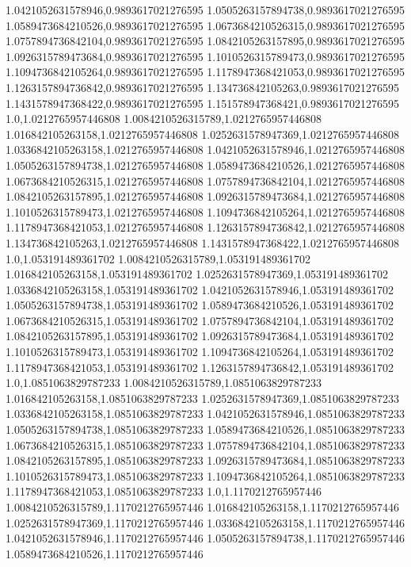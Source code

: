 1.0421052631578946,0.9893617021276595
1.0505263157894738,0.9893617021276595
1.0589473684210526,0.9893617021276595
1.0673684210526315,0.9893617021276595
1.0757894736842104,0.9893617021276595
1.0842105263157895,0.9893617021276595
1.0926315789473684,0.9893617021276595
1.1010526315789473,0.9893617021276595
1.1094736842105264,0.9893617021276595
1.1178947368421053,0.9893617021276595
1.1263157894736842,0.9893617021276595
1.134736842105263,0.9893617021276595
1.1431578947368422,0.9893617021276595
1.151578947368421,0.9893617021276595
1.0,1.0212765957446808
1.0084210526315789,1.0212765957446808
1.016842105263158,1.0212765957446808
1.0252631578947369,1.0212765957446808
1.0336842105263158,1.0212765957446808
1.0421052631578946,1.0212765957446808
1.0505263157894738,1.0212765957446808
1.0589473684210526,1.0212765957446808
1.0673684210526315,1.0212765957446808
1.0757894736842104,1.0212765957446808
1.0842105263157895,1.0212765957446808
1.0926315789473684,1.0212765957446808
1.1010526315789473,1.0212765957446808
1.1094736842105264,1.0212765957446808
1.1178947368421053,1.0212765957446808
1.1263157894736842,1.0212765957446808
1.134736842105263,1.0212765957446808
1.1431578947368422,1.0212765957446808
1.0,1.053191489361702
1.0084210526315789,1.053191489361702
1.016842105263158,1.053191489361702
1.0252631578947369,1.053191489361702
1.0336842105263158,1.053191489361702
1.0421052631578946,1.053191489361702
1.0505263157894738,1.053191489361702
1.0589473684210526,1.053191489361702
1.0673684210526315,1.053191489361702
1.0757894736842104,1.053191489361702
1.0842105263157895,1.053191489361702
1.0926315789473684,1.053191489361702
1.1010526315789473,1.053191489361702
1.1094736842105264,1.053191489361702
1.1178947368421053,1.053191489361702
1.1263157894736842,1.053191489361702
1.0,1.0851063829787233
1.0084210526315789,1.0851063829787233
1.016842105263158,1.0851063829787233
1.0252631578947369,1.0851063829787233
1.0336842105263158,1.0851063829787233
1.0421052631578946,1.0851063829787233
1.0505263157894738,1.0851063829787233
1.0589473684210526,1.0851063829787233
1.0673684210526315,1.0851063829787233
1.0757894736842104,1.0851063829787233
1.0842105263157895,1.0851063829787233
1.0926315789473684,1.0851063829787233
1.1010526315789473,1.0851063829787233
1.1094736842105264,1.0851063829787233
1.1178947368421053,1.0851063829787233
1.0,1.1170212765957446
1.0084210526315789,1.1170212765957446
1.016842105263158,1.1170212765957446
1.0252631578947369,1.1170212765957446
1.0336842105263158,1.1170212765957446
1.0421052631578946,1.1170212765957446
1.0505263157894738,1.1170212765957446
1.0589473684210526,1.1170212765957446
